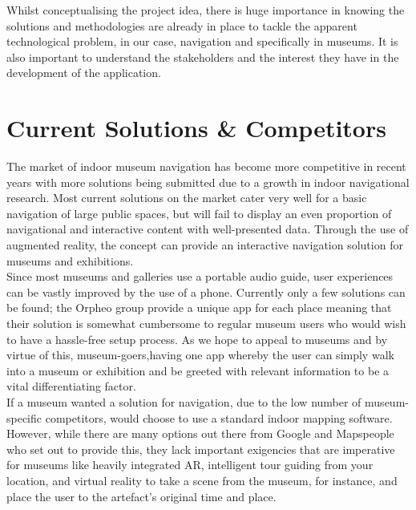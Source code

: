 
Whilst conceptualising the project idea, there is huge importance in knowing the solutions and methodologies are already in place to tackle the apparent technological problem, in our case, navigation and specifically in museums. It is also important to understand the stakeholders and the interest they have in the development of the application.

\section{Current Solutions \& Competitors}
The market of indoor museum navigation has become more competitive in recent years with more solutions being submitted due to a growth in indoor navigational research. Most current solutions on the market cater very well for a basic navigation of large public spaces, but will fail to display an even proportion of navigational and interactive content with well-presented data. Through the use of augmented reality, the concept can provide an interactive navigation solution for museums and exhibitions.\\
 
Since most museums and galleries use a portable audio guide, user experiences can be vastly improved by the use of a phone. Currently only a few solutions can be found; the Orpheo group \cite{orpheo} provide a unique app for each place meaning that their solution is somewhat cumbersome to regular museum users who would wish to have a hassle-free setup process. As we hope to appeal to museums and by virtue of this, museum-goers,having one app whereby the user can simply walk into a museum or exhibition and be greeted with relevant information to be a vital differentiating factor\cite{microsoft}.\\

If a museum wanted a solution for navigation, due to the low number of museum-specific competitors, would choose to use a standard indoor mapping software. \cite{engadget} However, while there are many options out there from Google and Mapspeople \cite{mapspeople} who set out to provide this, they lack important exigencies that are imperative for museums like heavily integrated AR, intelligent tour guiding from your location, and virtual reality to take a scene from the museum, for instance, and place the user to the artefact's original time and place.


